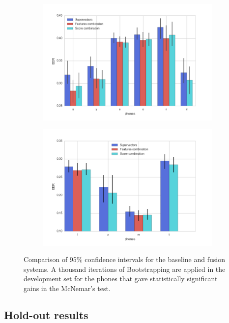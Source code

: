 \begin{figure}[H]
  \centering
  \begin{subfigure}{.47\textwidth}
    \centering
    \captionsetup{width=.95\linewidth}
    \includegraphics[width=1.08\linewidth, height=0.225\textheight]{files/figures/results/bootstrapping/bootstrapping_dev_2}
  \end{subfigure}
  \begin{subfigure}{.47\textwidth}
    \centering
    \captionsetup{width=.95\linewidth}
    \includegraphics[width=.72\linewidth, height=0.225\textheight]{files/figures/results/bootstrapping/bootstrapping_dev_1}
  \end{subfigure}
  \caption{Comparison of 95\% confidence intervals for the baseline and fusion systems.
  A thousand iterations of Bootstrapping are applied
  in the development set for the phones that gave statistically significant gains in the
  McNemar's test.}
  \label{fig:bootstrappingDev}
\end{figure}

\subsection{Hold-out results}

